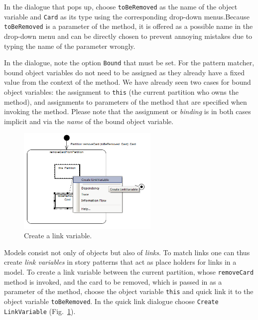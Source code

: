 In the dialogue that pops up, choose \texttt{toBeRemoved} as the name of the
object variable and \texttt{Card} as its type using the corresponding drop-down
menus.\clearpage  Because \texttt{toBeRemoved} is a parameter of the method, it
is offered as a possible name in the drop-down menu and can be directly chosen to prevent
annoying mistakes due to typing the name of the parameter wrongly.

In the dialogue, note the option \texttt{Bound} that must be set.
For the pattern matcher, bound object variables do not need to be assigned as
they already have a fixed value from the context of the method.  We have already
seen two cases  for bound object variables: the assignment to \texttt{this} (the
current  partition who owns the method), and assignments to parameters of the
method that  are specified when invoking the method.  Please note that the
assignment or \emph{binding} is in both cases implicit and via the \emph{name}
of the bound object variable. 

\begin{figure}[htp]
\begin{center}
  \includegraphics[width=0.6\textwidth]{pics/sdmBilder/removeCard/sdm11RAW}
  \caption{Create a link variable.}   
  \label{fig:link_variable}
\end{center}
\end{figure}

Models consist not only of objects but also of \emph{links}.  To match links one
can thus create \emph{link variables} in story patterns that act as place
holders for links in a model.  To create a link variable between the current
partition, whose \texttt{removeCard} method is invoked, and the card
to be removed, which is passed in as a parameter of the method, choose
the object variable \texttt{this} and quick link it to the object variable
\texttt{toBeRemoved}.  In the quick link dialogue choose \texttt{Create
LinkVariable} (Fig.~\ref{fig:link_variable}).

